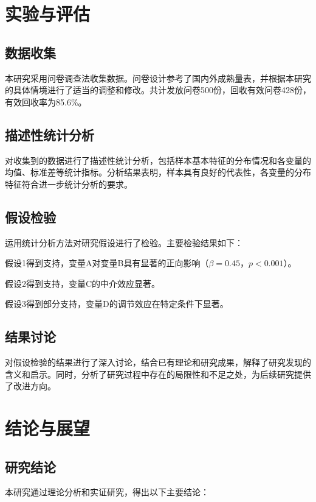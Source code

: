 \documentclass[numbering=arabic,fontset=auto]{jnuthesis}
\begin{document}
\chapter{实验与评估}

\section{数据收集}

本研究采用问卷调查法收集数据。问卷设计参考了国内外成熟量表，并根据本研究的具体情境进行了适当的调整和修改。共计发放问卷500份，回收有效问卷428份，有效回收率为85.6\%。

\section{描述性统计分析}

对收集到的数据进行了描述性统计分析，包括样本基本特征的分布情况和各变量的均值、标准差等统计指标。分析结果表明，样本具有良好的代表性，各变量的分布特征符合进一步统计分析的要求。

\section{假设检验}

运用统计分析方法对研究假设进行了检验。主要检验结果如下：

假设1得到支持，变量A对变量B具有显著的正向影响（$\beta = 0.45$，$p < 0.001$）。

假设2得到支持，变量C的中介效应显著。

假设3得到部分支持，变量D的调节效应在特定条件下显著。

\section{结果讨论}

对假设检验的结果进行了深入讨论，结合已有理论和研究成果，解释了研究发现的含义和启示。同时，分析了研究过程中存在的局限性和不足之处，为后续研究提供了改进方向。

\chapter{结论与展望}

\section{研究结论}

本研究通过理论分析和实证研究，得出以下主要结论：
\end{document}
